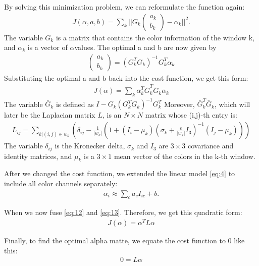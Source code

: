 By solving this minimization problem, we can reformulate the function again:
\begin{align}
	J(\alpha, a, b) = \sum_k || G_k \begin{pmatrix} a_k \\ b_k \end{pmatrix} - \alpha_k ||^2 .
\end{align}  
The variable \(G_k \) is a matrix that contains the color information of the window k, and \(\alpha_k\) is a vector of \(\alpha\)values. The optimal a and b are now given by 
\begin{align}
	\begin{pmatrix} a_k \\ b_k \end{pmatrix}  = \left( G_k^T G_k\right)^{-1} G_k^T \alpha_k  
\end{align}  
Substituting the optimal a and b back into the cost function, we get this form:
\begin{align}
	J(\alpha) = \sum_{k} \bar{\alpha}_k^T \bar{G}_k^T \bar{G}_k \bar{\alpha}_k
\end{align}  
The variable \(\bar{G}_k\) is defined as \( I - G_k(G_k^T G_k)^{-1} G_k^T\)
Moreover, \(\bar{G}_k^T \bar{G}_k\), which will later be the Laplacian matrix \(L\), is an \(N \times N\) matrix whose (i,j)-th entry is:
\begin{align} \label{eq:12}
	L_{ij} = \sum_{k | (i,j) \in w_k} \left( \delta_{ij} - \frac{1}{|w_k|} ( 1 + (I_i - \mu_k)(\sigma_k + \frac{\epsilon}{|w_k|} I_3)^{-1}(I_j - \mu_k) )  \right) 
\end{align}  
The variable \(\delta_{ij}\) is the Kronecker delta, \(\sigma_k\) and \(I_3\) are  \(3 \times 3\) covariance and identity matrices, and \(\mu_k\) is a \(3 \times 1\) mean vector of the colors in the k-th window.

After we changed the cost function, we extended the linear model \ref{eq:4} to include all color channels separately: 
\begin{align}\label{eq:13}
	\alpha_i \approx \sum_{c} a_c I_{ic} + b .
\end{align}  

When we now fuse \ref{eq:12} and \ref{eq:13}. Therefore, we get this quadratic form:
\begin{align}
	J(\alpha) = \alpha^T L \alpha
\end{align}  

Finally, to find the optimal alpha matte, we equate the cost function to 0 like this:
\begin{align}
	0 =  L \alpha
\end{align}  


